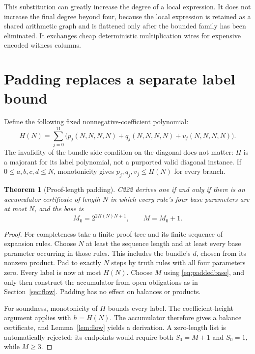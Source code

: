\documentclass[11pt,a4paper]{article}
\newtheorem{theorem}{Theorem}[section]
\theoremstyle{definition}\newtheorem{definition}[theorem]{Definition}
\theoremstyle{remark}\newtheorem{remark}[theorem]{Remark}
\numberwithin{equation}{section}
\begin{document}
This substitution can greatly increase the degree of a local expression.
It does not increase the final degree beyond four, because the local
expression is retained as a shared arithmetic graph and is flattened
only after the bounded family has been eliminated. It exchanges cheap
deterministic multiplication wires for expensive encoded witness columns.

\section{Padding replaces a separate label bound}
\label{sec:padding}

Define the following fixed nonnegative-coefficient polynomial:
\begin{equation}
 H(N)=\sum_{j=0}^{11}
 \bigl(p_j(N,N,N,N)+q_j(N,N,N,N)+v_j(N,N,N,N)\bigr).
\label{eq:H}
\end{equation}
The invalidity of the bundle side condition on the diagonal does not
matter: \(H\) is a majorant for its label polynomial, not a purported
valid diagonal instance. If \(0\le a,b,c,d\le N\), monotonicity gives
\(p_j,q_j,v_j\le H(N)\) for every branch.

\begin{theorem}[Proof-length padding]\label{thm:padding}
C222 derives one if and only if there is an accumulator certificate of
length \(N\) in which every rule's four base parameters are at most
\(N\), and the base is
\begin{equation}
 M_0=2^{2H(N)N+1},\qquad M=M_0+1.
\label{eq:paddedbase}
\end{equation}
\end{theorem}
\begin{proof}
For completeness take a finite proof tree and its finite sequence of
expansion rules. Choose \(N\) at least the sequence length and at least
every base parameter occurring in those rules. This includes the
bundle's \(d\), chosen from its nonzero product. Pad to exactly \(N\)
steps by truth rules with all four parameters zero. Every label is now
at most \(H(N)\). Choose \(M\) using \eqref{eq:paddedbase}, and only
then construct the accumulator from open obligations as in
Section~\ref{sec:flow}. Padding has no effect on balances or products.

For soundness, monotonicity of \(H\) bounds every label. The
coefficient-height argument applies with \(h=H(N)\). The accumulator
therefore gives a balance certificate, and Lemma~\ref{lem:flow} yields a
derivation. A zero-length list is automatically rejected: its endpoints
would require both \(S_0=M+1\) and \(S_0=1\), while \(M\ge3\).
\end{proof}
\end{document}
